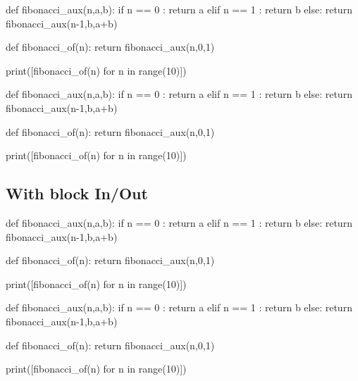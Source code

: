 \documentclass[a4paper,11pt]{article}
\begin{document}
\begin{codehigh}
\begin{NotebookPitonConsole}[center]{0.75\linewidth}
def fibonacci_aux(n,a,b):
  if n == 0 :
    return a
  elif n == 1 :
    return b
  else:
    return fibonacci_aux(n-1,b,a+b)

def fibonacci_of(n):
  return fibonacci_aux(n,0,1)

print([fibonacci_of(n) for n in range(10)])
\end{NotebookPitonConsole}
\end{codehigh}

\begin{NotebookPitonConsole}[center]{0.75\linewidth}
def fibonacci_aux(n,a,b):
	if n == 0 :
		return a
	elif n == 1 :
		return b
	else:
		return fibonacci_aux(n-1,b,a+b)

def fibonacci_of(n):
	return fibonacci_aux(n,0,1)

print([fibonacci_of(n) for n in range(10)])
\end{NotebookPitonConsole}

\pagebreak

\subsection{With block In/Out}

\setcounter{JupyterIn}{0}

\begin{codehigh}
\begin{NotebookPitonInOut}{0.75\linewidth}
def fibonacci_aux(n,a,b):
  if n == 0 :
    return a
  elif n == 1 :
    return b
  else:
    return fibonacci_aux(n-1,b,a+b)

def fibonacci_of(n):
  return fibonacci_aux(n,0,1)

print([fibonacci_of(n) for n in range(10)])
\end{NotebookPitonInOut}
\end{codehigh}

\begin{NotebookPitonInOut}{0.75\linewidth}
def fibonacci_aux(n,a,b):
	if n == 0 :
		return a
	elif n == 1 :
		return b
	else:
		return fibonacci_aux(n-1,b,a+b)

def fibonacci_of(n):
	return fibonacci_aux(n,0,1)

print([fibonacci_of(n) for n in range(10)])
\end{NotebookPitonInOut}
\end{document}
